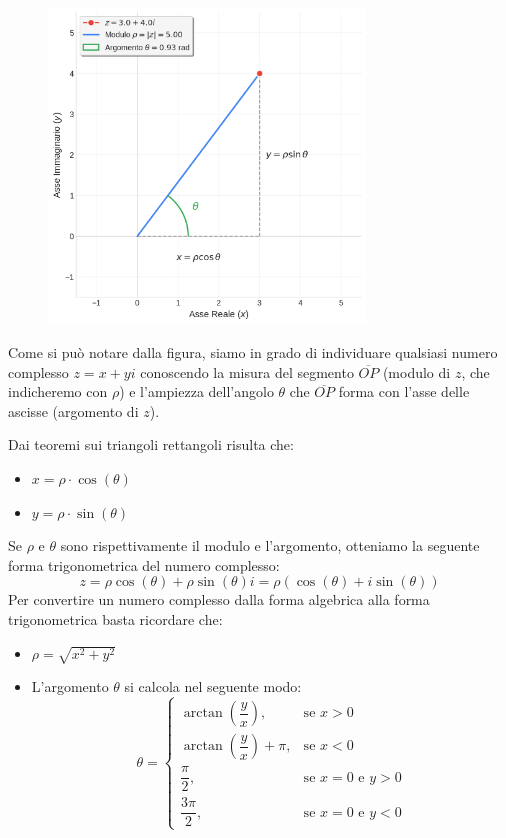 \begin{figure}[H]
  \centering
  \includegraphics[width=0.75\textwidth]{img/piano_gauss_trigonometrico.png}
\end{figure}

Come si può notare dalla figura, siamo in grado di individuare qualsiasi numero complesso $z = x + yi$ conoscendo la misura del segmento $\overline{OP}$ (modulo di $z$, che indicheremo con $\rho$) e l'ampiezza dell'angolo $\theta$ che $\overline{OP}$ forma con l'asse delle ascisse (argomento di $z$).

Dai teoremi sui triangoli rettangoli risulta che:
\begin{itemize}
  \item $x = \rho \cdot \cos(\theta)$
  \item $y = \rho \cdot \sin(\theta)$
\end{itemize}

Se $\rho$ e $\theta$ sono rispettivamente il modulo e l'argomento, otteniamo la seguente forma trigonometrica del numero complesso:
\[
z = \rho \cos(\theta) + \rho \sin(\theta)i = \rho (\cos(\theta) + i\sin(\theta))
\]
Per convertire un numero complesso dalla forma algebrica alla forma trigonometrica basta ricordare che:
\begin{itemize}
  \item $\rho = \sqrt{x^2 + y^2}$
  \item 
  L'argomento $\theta$ si calcola nel seguente modo:
  \[
  \theta =
  \begin{cases}
    \arctan\!\left(\dfrac{y}{x}\right), & \text{se } x > 0 \\
    \arctan\!\left(\dfrac{y}{x}\right) + \pi, & \text{se } x < 0 \\
    \dfrac{\pi}{2}, & \text{se } x = 0 \text{ e } y > 0 \\
    \dfrac{3\pi}{2}, & \text{se } x = 0 \text{ e } y < 0
  \end{cases}
  \]
\end{itemize}


